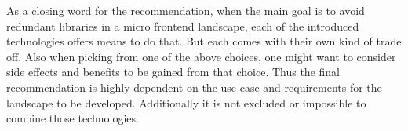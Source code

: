As a closing word for the recommendation, when the main goal is to avoid redundant libraries in a micro frontend landscape, each of the introduced technologies offers means to do that. But each comes with their own kind of trade off. Also when picking from one of the above choices, one might want to consider side effects and benefits to be gained from that choice. Thus the final recommendation is highly dependent on the use case and requirements for the landscape to be developed.
Additionally it is not excluded or impossible to combine those technologies. 

